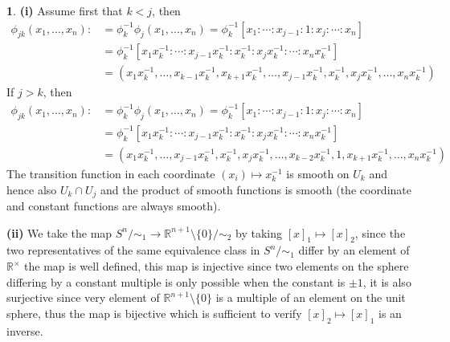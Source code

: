 \documentclass[10.5pt]{article}
\theoremstyle{definition}
\newtheorem{pb}{}
\newcommand{\set}[1]{\{#1\}}
\begin{document}
    \begin{pb}
        \textbf{(i)} Assume first that \(k<j\), then
        \begin{align*}
            \phi_{jk}(x_1,\hdots,x_n) :&= \phi_k^{-1}\phi_j(x_1,\hdots,x_n) = \phi_k^{-1}[x_1:\cdots:x_{j-1}:1:x_j:\cdots:x_n] \\
            &= \phi_k^{-1}[x_1x_k^{-1}:\cdots:x_{j-1}x_k^{-1}:x_k^{-1}:x_jx_k^{-1}:\cdots:x_nx_k^{-1}] \\
            &= (x_1x_k^{-1},\hdots,x_{k-1}x_k^{-1},x_{k+1}x_k^{-1},\hdots,x_{j-1}x_k^{-1},x_k^{-1},x_jx_k^{-1},\hdots,x_nx_k^{-1})
        \end{align*}
        If \(j > k\), then
        \begin{align*}
            \phi_{jk}(x_1,\hdots,x_n) :&= \phi_k^{-1}\phi_j(x_1,\hdots,x_n) = \phi_k^{-1}[x_1:\cdots:x_{j-1}:1:x_j:\cdots:x_n] \\
            &= \phi_k^{-1}[x_1x_k^{-1}:\cdots:x_{j-1}x_k^{-1}:x_k^{-1}:x_jx_k^{-1}:\cdots:x_nx_k^{-1}] \\
            &= (x_1x_k^{-1},\hdots,x_{j-1}x_k^{-1},x_k^{-1},x_jx_k^{-1},\hdots,x_{k-2}x_k^{-1},1,x_{k+1}x_k^{-1},\hdots,x_nx_k^{-1})
        \end{align*}
        The transition function in each coordinate \((x_i) \mapsto x_k^{-1}\) is smooth on \(U_k\) and hence also \(U_k \cap U_j\) and the product of smooth functions is smooth (the coordinate and constant functions are always smooth).

        \textbf{(ii)} We take the map \(S^n/\sim_1 \to \mathbb{R}^{n+1}\setminus\set{0}/\sim_2\) by taking \([x]_1 \mapsto [x]_2\), since the two representatives of the same equivalence class in \(S^n/\sim_1\) differ by an element of \(\mathbb{R}^\times\) the map is well defined, this map is injective since two elements on the sphere differing by a constant multiple is only possible when the constant is \(\pm 1\), it is also surjective since very element of \(\mathbb{R}^{n+1}\setminus\set{0}\) is a multiple of an element on the unit sphere, thus the map is bijective which is sufficient to verify \([x]_2 \mapsto [x]_1\) is an inverse.  


\end{pb}
\end{document}
